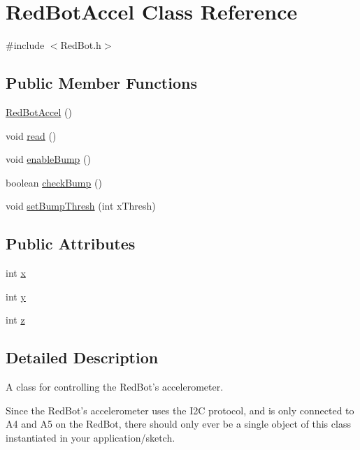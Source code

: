 \hypertarget{class_red_bot_accel}{\section{Red\-Bot\-Accel Class Reference}
\label{class_red_bot_accel}
}


{\ttfamily \#include $<$Red\-Bot.\-h$>$}

\subsection*{Public Member Functions}
\begin{DoxyCompactItemize}
\item 
\hyperlink{class_red_bot_accel_ad2d0de0051d6570ab9d0d4f06e7468a9}{Red\-Bot\-Accel} ()
\item 
void \hyperlink{class_red_bot_accel_a2b205e64828e57dcf2fb35ee81d5e731}{read} ()
\item 
void \hyperlink{class_red_bot_accel_a861b1e8f2cd9e35c3b2caee54d43d2d1}{enable\-Bump} ()
\item 
boolean \hyperlink{class_red_bot_accel_a88e803ce82865fa875e17e85f9e56801}{check\-Bump} ()
\item 
void \hyperlink{class_red_bot_accel_ace6875bab4125392c24c4fecc0313c32}{set\-Bump\-Thresh} (int x\-Thresh)
\end{DoxyCompactItemize}
\subsection*{Public Attributes}
\begin{DoxyCompactItemize}
\item 
int \hyperlink{class_red_bot_accel_a190369eae35db9db9d406dab70ec90ad}{x}
\item 
int \hyperlink{class_red_bot_accel_a1a4efe3197febc4632b8fc48237bb440}{y}
\item 
int \hyperlink{class_red_bot_accel_a8678bd23d5f1913950b5c97b9487a9da}{z}
\end{DoxyCompactItemize}


\subsection{Detailed Description}
A class for controlling the Red\-Bot's accelerometer.

Since the Red\-Bot's accelerometer uses the I2\-C protocol, and is only connected to A4 and A5 on the Red\-Bot, there should only ever be a single object of this class instantiated in your application/sketch. 

